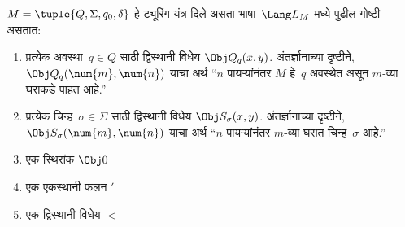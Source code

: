 \begin{defn}
  \label{tur:und:rep:defn:tm-descr}
$M = \tuple{Q, \Sigma, q_0, \delta}$
हे ट्यूरिंग यंत्र दिले असता
भाषा~$\Lang L_M$ मध्ये पुढील
गोष्टी असतात:
\begin{enumerate}
\item प्रत्येक अवस्था~$q \in Q$ साठी
  द्विस्थानी विधेय $\Obj Q_q(x, y)$.
  अंतर्ज्ञानाच्या दृष्टीने,
  $\Obj Q_q(\num{m}, \num{n})$
  याचा अर्थ “$n$ पायऱ्यांनंतर
  $M$ हे~$q$ अवस्थेत असून
  $m$-व्या घराकडे पाहत आहे.”
\item प्रत्येक चिन्ह~$\sigma\in \Sigma$
  साठी द्विस्थानी विधेय
  $\Obj S_\sigma(x, y)$.
  अंतर्ज्ञानाच्या दृष्टीने,
  $\Obj S_\sigma(\num{m},
  \num{n})$ याचा अर्थ “$n$
  पायऱ्यांनंतर $m$-व्या घरात
  चिन्ह~$\sigma$ आहे.”
\item एक स्थिरांक $\Obj 0$
\item एक एकस्थानी फलन $\prime$
\item एक द्विस्थानी विधेय $<$
\end{enumerate}
\end{defn}

